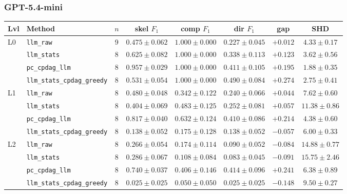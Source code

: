 \subsubsection{GPT-5.4-mini}
\label{app:results:gpt54mini}

\begin{center}
\scriptsize
\setlength{\tabcolsep}{3.0pt}
\begin{tabular}{@{}l l c c c c c c@{}}
\toprule
Lvl & Method & $n$ & skel $F_1$ & comp $F_1$ & dir $F_1$ & gap & SHD \\
\midrule
L0 & \texttt{llm\_raw}                & 9 & $0.475 \pm 0.062$ & $1.000 \pm 0.000$ & $0.227 \pm 0.045$ & $+0.012$ & $4.33 \pm 0.17$ \\
   & \texttt{llm\_stats}              & 8 & $0.625 \pm 0.082$ & $1.000 \pm 0.000$ & $0.338 \pm 0.113$ & $+0.123$ & $3.62 \pm 0.56$ \\
   & \texttt{pc\_cpdag\_llm}          & 8 & $0.957 \pm 0.029$ & $1.000 \pm 0.000$ & $0.411 \pm 0.105$ & $+0.195$ & $1.88 \pm 0.35$ \\
   & \texttt{llm\_stats\_cpdag\_greedy} & 8 & $0.531 \pm 0.054$ & $1.000 \pm 0.000$ & $0.490 \pm 0.084$ & $+0.274$ & $2.75 \pm 0.41$ \\
\midrule
L1 & \texttt{llm\_raw}                & 8 & $0.480 \pm 0.048$ & $0.342 \pm 0.122$ & $0.240 \pm 0.066$ & $+0.044$ & $7.62 \pm 0.60$ \\
   & \texttt{llm\_stats}              & 8 & $0.404 \pm 0.069$ & $0.483 \pm 0.125$ & $0.252 \pm 0.081$ & $+0.057$ & $11.38 \pm 0.86$ \\
   & \texttt{pc\_cpdag\_llm}          & 8 & $0.817 \pm 0.040$ & $0.632 \pm 0.124$ & $0.410 \pm 0.086$ & $+0.214$ & $4.38 \pm 0.60$ \\
   & \texttt{llm\_stats\_cpdag\_greedy} & 8 & $0.138 \pm 0.052$ & $0.175 \pm 0.128$ & $0.138 \pm 0.052$ & $-0.057$ & $6.00 \pm 0.33$ \\
\midrule
L2 & \texttt{llm\_raw}                & 8 & $0.266 \pm 0.054$ & $0.174 \pm 0.114$ & $0.090 \pm 0.052$ & $-0.084$ & $14.88 \pm 0.77$ \\
   & \texttt{llm\_stats}              & 8 & $0.286 \pm 0.067$ & $0.108 \pm 0.084$ & $0.083 \pm 0.045$ & $-0.091$ & $15.75 \pm 2.46$ \\
   & \texttt{pc\_cpdag\_llm}          & 8 & $0.740 \pm 0.037$ & $0.406 \pm 0.146$ & $0.414 \pm 0.096$ & $+0.241$ & $6.38 \pm 0.89$ \\
   & \texttt{llm\_stats\_cpdag\_greedy} & 8 & $0.025 \pm 0.025$ & $0.050 \pm 0.050$ & $0.025 \pm 0.025$ & $-0.148$ & $9.50 \pm 0.27$ \\

\end{tabular}
\end{center}
